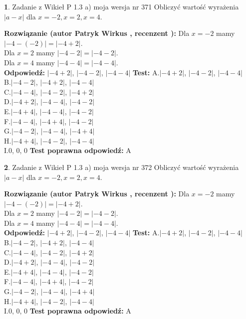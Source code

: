 \documentclass[12pt, a4paper]{article}
\theoremstyle{definition} %
\newtheorem{zad}{}
\newcommand{\zadStart}[1]{\begin{zad}#1\newline}
\newcommand{\zadStop}{\end{zad}}
\newcommand{\rozwStart}[2]{\noindent \textbf{Rozwiązanie (autor #1 , recenzent #2): }\newline}
\newcommand{\rozwStop}{\newline}
\newcommand{\odpStart}{\noindent \textbf{Odpowiedź:}\newline}
\newcommand{\odpStop}{\newline}
\newcommand{\testStart}{\noindent \textbf{Test:}\newline}
\newcommand{\testStop}{\newline}
\newcommand{\kluczStart}{\noindent \textbf{Test poprawna odpowiedź:}\newline}
\newcommand{\kluczStop}{\newline}
\begin{document}
\zadStart{Zadanie z Wikieł P 1.3 a) moja wersja nr 371}
Obliczyć wartość wyrażenia $|a - x|$ dla $x=-2,x=2,x=4$.
\zadStop
\rozwStart{Patryk Wirkus}{}
Dla $x = -2$ mamy $|-4 - (-2)| = |-4 + 2|$.\\
Dla $x = 2$ mamy $|-4 - 2| = |-4 - 2|$.\\
Dla $x = 4$ mamy $|-4 - 4| = |-4 - 4|$.\\
\rozwStop
\odpStart
$|-4 + 2|$, $|-4 - 2|$, $|-4 - 4|$
\odpStop
\testStart
A.$|-4 + 2|$, $|-4 - 2|$, $|-4 - 4|$\\
B.$|-4 - 2|$, $|-4 + 2|$, $|-4 - 4|$\\
C.$|-4 - 4|$, $|-4 - 2|$, $|-4 + 2|$\\
D.$|-4 + 2|$, $|-4 - 4|$, $|-4 - 2|$\\
E.$|-4 + 4|$, $|-4 - 4|$, $|-4 - 2|$\\
F.$|-4 - 4|$, $|-4 + 4|$, $|-4 - 2|$\\
G.$|-4 - 2|$, $|-4 - 4|$, $|-4 + 4|$\\
H.$|-4 + 4|$, $|-4 - 2|$, $|-4 - 4|$\\
I.$0$, $0$, $0$
\testStop
\kluczStart
A
\kluczStop



\zadStart{Zadanie z Wikieł P 1.3 a) moja wersja nr 372}
Obliczyć wartość wyrażenia $|a - x|$ dla $x=-2,x=2,x=4$.
\zadStop
\rozwStart{Patryk Wirkus}{}
Dla $x = -2$ mamy $|-4 - (-2)| = |-4 + 2|$.\\
Dla $x = 2$ mamy $|-4 - 2| = |-4 - 2|$.\\
Dla $x = 4$ mamy $|-4 - 4| = |-4 - 4|$.\\
\rozwStop
\odpStart
$|-4 + 2|$, $|-4 - 2|$, $|-4 - 4|$
\odpStop
\testStart
A.$|-4 + 2|$, $|-4 - 2|$, $|-4 - 4|$\\
B.$|-4 - 2|$, $|-4 + 2|$, $|-4 - 4|$\\
C.$|-4 - 4|$, $|-4 - 2|$, $|-4 + 2|$\\
D.$|-4 + 2|$, $|-4 - 4|$, $|-4 - 2|$\\
E.$|-4 + 4|$, $|-4 - 4|$, $|-4 - 2|$\\
F.$|-4 - 4|$, $|-4 + 4|$, $|-4 - 2|$\\
G.$|-4 - 2|$, $|-4 - 4|$, $|-4 + 4|$\\
H.$|-4 + 4|$, $|-4 - 2|$, $|-4 - 4|$\\
I.$0$, $0$, $0$
\testStop
\kluczStart
A
\kluczStop
\end{document}
